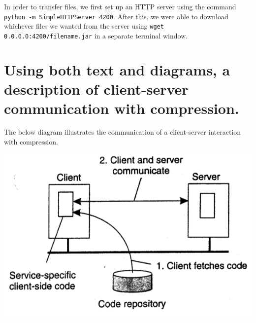 \documentclass{article}
\begin{document}
\vspace{3mm}

In order to transfer files, we first set up an HTTP server using the command 
\texttt{python -m SimpleHTTPServer 4200}. After this, we were able to download whichever files we wanted from the server using \texttt{wget 0.0.0.0:4200/filename.jar} in a separate terminal window. 


\section{Using both text and diagrams, a description of client-server communication with compression.}

The below diagram illustrates the communication of a client-server interaction with compression.

\includegraphics[scale=0.5]{figure317.png}
\end{document}
